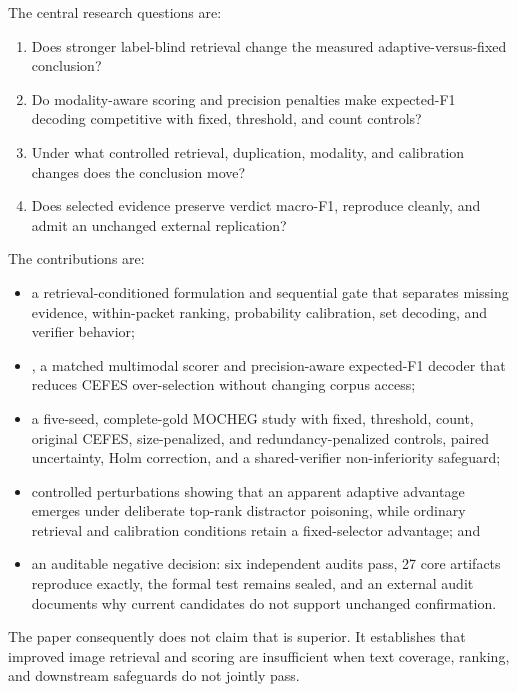 The central research questions are:
\begin{enumerate}
    \item Does stronger label-blind retrieval change the measured adaptive-versus-fixed conclusion?
    \item Do modality-aware scoring and precision penalties make expected-F1 decoding competitive with fixed, threshold, and count controls?
    \item Under what controlled retrieval, duplication, modality, and calibration changes does the conclusion move?
    \item Does selected evidence preserve verdict macro-F1, reproduce cleanly, and admit an unchanged external replication?
\end{enumerate}

The contributions are:
\begin{itemize}
    \item a retrieval-conditioned formulation and sequential gate that separates missing evidence, within-packet ranking, probability calibration, set decoding, and verifier behavior;
    \item \method{}, a matched multimodal scorer and precision-aware expected-F1 decoder that reduces CEFES over-selection without changing corpus access;
    \item a five-seed, complete-gold MOCHEG study with fixed, threshold, count, original CEFES, size-penalized, and redundancy-penalized controls, paired uncertainty, Holm correction, and a shared-verifier non-inferiority safeguard;
    \item controlled perturbations showing that an apparent adaptive advantage emerges under deliberate top-rank distractor poisoning, while ordinary retrieval and calibration conditions retain a fixed-selector advantage; and
    \item an auditable negative decision: six independent audits pass, 27 core artifacts reproduce exactly, the formal test remains sealed, and an external audit documents why current candidates do not support unchanged confirmation.
\end{itemize}

The paper consequently does not claim that \method{} is superior. It establishes that improved image retrieval and scoring are insufficient when text coverage, ranking, and downstream safeguards do not jointly pass.
